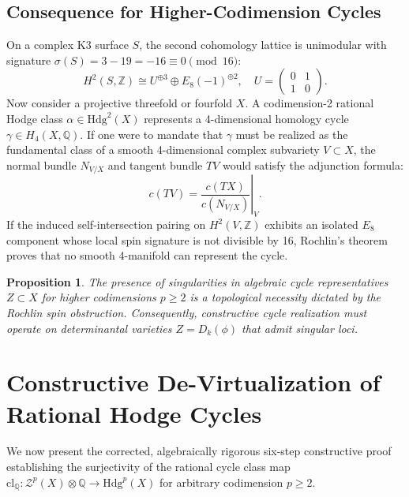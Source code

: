 \documentclass[11pt,reqno]{article}
\newtheorem{proposition}[theorem]{Proposition}
\theoremstyle{definition}
\newcommand{\Hdg}{\mathrm{Hdg}}
\begin{document}
\subsection{Consequence for Higher-Codimension Cycles}
On a complex K3 surface $S$, the second cohomology lattice is unimodular with signature $\sigma(S) = 3 - 19 = -16 \equiv 0 \pmod{16}$:
\begin{equation}
H^2(S, \mathbb{Z}) \cong U^{\oplus 3} \oplus E_8(-1)^{\oplus 2}, \quad U = \begin{pmatrix} 0 & 1 \\ 1 & 0 \end{pmatrix}.
\end{equation}
Now consider a projective threefold or fourfold $X$. A codimension-2 rational Hodge class $\alpha \in \Hdg^2(X)$ represents a 4-dimensional homology cycle $\gamma \in H_4(X, \mathbb{Q})$. If one were to mandate that $\gamma$ must be realized as the fundamental class of a smooth 4-dimensional complex subvariety $V \subset X$, the normal bundle $N_{V/X}$ and tangent bundle $TV$ would satisfy the adjunction formula:
\begin{equation}
c(TV) = \left.\frac{c(TX)}{c(N_{V/X})}\right|_V.
\end{equation}
If the induced self-intersection pairing on $H^2(V, \mathbb{Z})$ exhibits an isolated $E_8$ component whose local spin signature is not divisible by 16, Rochlin's theorem proves that no smooth 4-manifold can represent the cycle.

\begin{proposition}
The presence of singularities in algebraic cycle representatives $Z \subset X$ for higher codimensions $p \ge 2$ is a topological necessity dictated by the Rochlin spin obstruction. Consequently, constructive cycle realization must operate on determinantal varieties $Z = D_k(\phi)$ that admit singular loci.
\end{proposition}

\section{Constructive De-Virtualization of Rational Hodge Cycles}

We now present the corrected, algebraically rigorous six-step constructive proof establishing the surjectivity of the rational cycle class map $\mathrm{cl}_\mathbb{Q} : \mathcal{Z}^p(X) \otimes \mathbb{Q} \to \Hdg^p(X)$ for arbitrary codimension $p \ge 2$.
\end{document}
